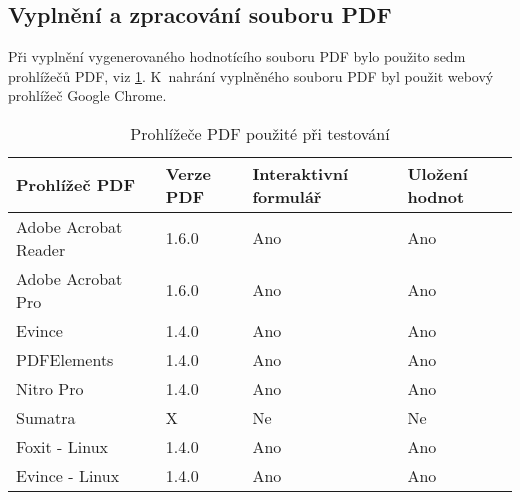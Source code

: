 \subsection{Vyplnění a zpracování souboru PDF}
Při vyplnění vygenerovaného hodnotícího souboru PDF bylo použito sedm prohlížečů PDF, viz \ref{tab:table_zpracovani}. K~nahrání vyplněného souboru PDF byl použit webový prohlížeč Google Chrome.

\begin{table}[h!]
\centering
\begin{tabular}{|l|l|l|l|} 
\hline
\textbf{Prohlížeč PDF} & \textbf{Verze PDF} & \textbf{Interaktivní formulář} & \textbf{Uložení hodnot}  \\ 
\hline
Adobe Acrobat Reader   & 1.6.0                & Ano                            & Ano                      \\ 
\hline
Adobe Acrobat Pro      & 1.6.0                & Ano                            & Ano                      \\ 
\hline
Evince                 & 1.4.0                & Ano                            & Ano                      \\ 
\hline
PDFElements            & 1.4.0                & Ano                            & Ano                      \\ 
\hline
Nitro Pro              & 1.4.0                & Ano                            & Ano                      \\ 
\hline
Sumatra                & X                  & Ne                             & Ne                       \\ 
\hline
Foxit - Linux          & 1.4.0                & Ano                            & Ano                      \\ 
\hline
Evince - Linux         & 1.4.0                & Ano                            & Ano                      \\
\hline
\end{tabular}
\caption{Prohlížeče PDF použité při testování}
\label{tab:table_zpracovani}
\end{table}

